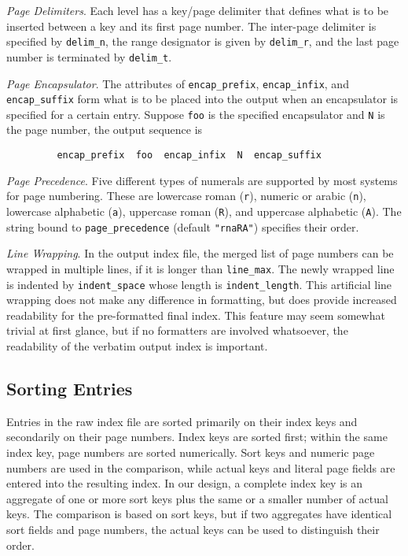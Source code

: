 {\it Page Delimiters\/}.  Each level has a key/page delimiter
that defines what is to be inserted between a key and its first
page number.  The inter-page delimiter is specified by \verb|delim_n|,
the range designator is given by \verb|delim_r|, and the last page
number is terminated by \verb|delim_t|.

{\it Page Encapsulator\/}.  The attributes of
\verb|encap_prefix|, \verb|encap_infix|, and \verb|encap_suffix|
form what is to be placed into the output
 when an encapsulator is specified
for a certain entry.  Suppose \verb|foo| is the specified encapsulator
and \verb|N| is the page number, the output sequence is
\begin{verbatim}
	     encap_prefix  foo  encap_infix  N  encap_suffix
\end{verbatim}

{\it Page Precedence\/}.  Five different types of numerals are
supported by most systems for page numbering.  These are
lowercase roman (\verb|r|), numeric or arabic (\verb|n|),
lowercase alphabetic (\verb|a|), uppercase roman (\verb|R|),
and uppercase alphabetic (\verb|A|).  The string bound to
\verb|page_precedence| (default \verb|"rnaRA"|)
specifies their order.

{\it Line Wrapping\/}.  In the output index file,
the merged list of page numbers	can be wrapped in multiple lines,
if it is longer than \verb|line_max|.  The newly wrapped
line is indented by \verb|indent_space| whose length is
\verb|indent_length|.  This artificial line wrapping does not
make any difference in formatting, but does provide increased
readability for the pre-formatted final index.
This feature may seem somewhat trivial at first glance, but if no
formatters are involved whatsoever, the readability of the
verbatim output index is important.

\subsection{Sorting Entries}
Entries in the raw index file are sorted primarily on their index keys
and secondarily on their page numbers.
Index keys are sorted first; within the same index key,
page numbers are sorted numerically.
Sort keys and numeric page numbers are used in the comparison, while
actual keys and literal page fields are entered into the
resulting index.  In our design,
a complete index key is an aggregate of one or more sort keys plus the same
or a smaller number of actual keys.  The comparison is based on
sort keys, but if two aggregates have identical sort fields and
page numbers, the actual keys can be used to distinguish their order.

